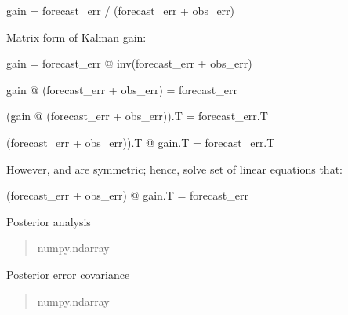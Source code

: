 \documentclass[letterpaper,10pt,english]{sphinxmanual}
\begin{document}
\begin{fulllineitems}
\begin{fulllineitems}
\sphinxAtStartPar
gain = forecast\_err / (forecast\_err + obs\_err)

\sphinxAtStartPar
Matrix form of Kalman gain:

\sphinxAtStartPar
gain = forecast\_err @ inv(forecast\_err + obs\_err)

\sphinxAtStartPar
gain @ (forecast\_err + obs\_err) = forecast\_err

\sphinxAtStartPar
(gain @ (forecast\_err + obs\_err)).T = forecast\_err.T

\sphinxAtStartPar
(forecast\_err + obs\_err)).T @ gain.T = forecast\_err.T

\sphinxAtStartPar
However,  and  are symmetric;
hence, solve set of linear equations that:

\sphinxAtStartPar
(forecast\_err + obs\_err) @ gain.T = forecast\_err

\begin{fulllineitems}
\label{\detokenize{kalman:glomar_gridding.autoregressive_kalman.KalmanOut.wgt_mean}}
\pysigstartsignatures
\pysigline
{}
\pysigstopsignatures
\sphinxAtStartPar
Posterior analysis
\begin{quote}\begin{description}
\sphinxAtStartPar
numpy.ndarray

\end{description}\end{quote}

\end{fulllineitems}


\begin{fulllineitems}
\label{\detokenize{kalman:glomar_gridding.autoregressive_kalman.KalmanOut.errcov}}
\pysigstartsignatures
\pysigline
{}
\pysigstopsignatures
\sphinxAtStartPar
Posterior error covariance
\begin{quote}\begin{description}
\sphinxAtStartPar
numpy.ndarray

\end{description}\end{quote}


\end{fulllineitems}
\end{fulllineitems}
\end{fulllineitems}
\end{document}
